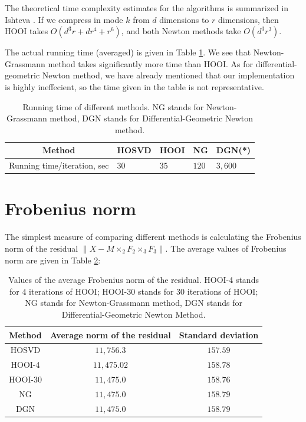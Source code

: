 The theoretical time complexity estimates for the algorithms
is summarized in Ishteva \cite{ishteva_thesis}. If we compress in mode $k$
from $d$ dimensions to $r$ dimensions, then HOOI takes $O(d^3r + dr^4 + r^6)$,
and both Newton methods take $O(d^3 r^3)$.

The actual running time (averaged) is given in Table \ref{running_time_per_iteration}.
We see that Newton-Grassmann method takes significantly more time than HOOI.
As for differential-geometric Newton method, we have already mentioned
that our implementation is highly ineffecient, so the time given in the table
is not representative.

\begin{table}[h]
\centering
\begin{tabular}{|c|l|l|l|l|}
\hline
Method & HOSVD & HOOI & NG & DGN(*) \\ \hline
Running time/iteration, sec & $30$  & $35$  & $120$ & $3,600$ \\ \hline
\end{tabular}
\caption{Running time of different methods. NG stands for Newton-Grassmann
method, DGN stands for Differential-Geometric Newton method.}
\label{running_time_per_iteration}
\end{table}

\section{Frobenius norm}

The simplest measure of comparing different methods
is calculating the Frobenius norm of the residual $\| X - M \times_2 F_2 \times_3 F_3 \|$.
The average values of Frobenius norm are given in {Table \ref{frob-norm-residual}}:





\begin{table}[h]
\centering
\begin{tabular}{|c|c|c|}
\hline
Method                         & Average norm of the residual & Standard deviation \\ \hline
HOSVD                         & $11,756.3$   &  $157.59$      \\ \hline
HOOI-4                        & $11,475.02$  &  $158.78$     \\ \hline
HOOI-30                       & $11,475.0$   &  $158.76$     \\ \hline
NG              & $11,475.0$   &  $158.79$     \\ \hline
DGN &  $11,475.0$  &  $158.79$      \\ \hline
\end{tabular}
\caption{Values of the average Frobenius norm of the residual. HOOI-4 stands for $4$ iterations of HOOI; HOOI-30 stands for $30$ iterations of HOOI; NG stands for Newton-Grassmann method, DGN stands for Differential-Geometric Newton Method.}
\label{frob-norm-residual}
\end{table}


